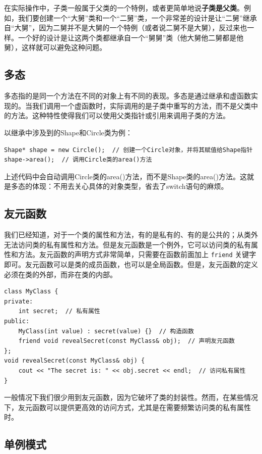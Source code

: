 在实际操作中，子类一般属于父类的一个特例，或者更简单地说\textbf{子类是父类}。例如，我们要创建一个“大舅”类和一个“二舅”类，一个非常差的设计是让“二舅”继承自“大舅”，因为二舅并不是大舅的一个特例（或者说二舅不是大舅），反过来也一样。一个好的设计是让这两个类都继承自一个“舅舅”类（他大舅他二舅都是他舅），这样就可以避免这种问题。

\subsection{多态}

多态指的是同一个方法在不同的对象上有不同的表现。多态是通过继承和虚函数实现的。当我们调用一个虚函数时，实际调用的是子类中重写的方法，而不是父类中的方法。这种特性使得我们可以使用父类指针或引用来调用子类的方法。

以继承中涉及到的Shape和Circle类为例：
\begin{verbatim}
Shape* shape = new Circle();  // 创建一个Circle对象，并将其赋值给Shape指针
shape->area();  // 调用Circle类的area()方法
\end{verbatim}
上述代码中会自动调用Circle类的area()方法，而不是Shape类的area()方法。这就是多态的体现：不用去关心具体的对象类型，省去了switch语句的麻烦。

\subsection{友元函数}

我们已经知道，对于一个类的属性和方法，有的是私有的、有的是公共的；从类外无法访问类的私有属性和方法。但是友元函数是一个例外，它可以访问类的私有属性和方法。友元函数的声明方式非常简单，只需要在函数前面加上 \texttt{friend} 关键字即可。友元函数可以是类的成员函数，也可以是全局函数。但是，友元函数的定义必须在类的外部，而非在类的内部。
\begin{verbatim}
class MyClass {
private:
    int secret;  // 私有属性
public:
    MyClass(int value) : secret(value) {}  // 构造函数
    friend void revealSecret(const MyClass& obj);  // 声明友元函数
};
void revealSecret(const MyClass& obj) {
    cout << "The secret is: " << obj.secret << endl;  // 访问私有属性
}
\end{verbatim}

一般情况下我们很少用到友元函数，因为它破坏了类的封装性。然而，在某些情况下，友元函数可以提供更高效的访问方式，尤其是在需要频繁访问类的私有属性时。

\subsection{单例模式}

